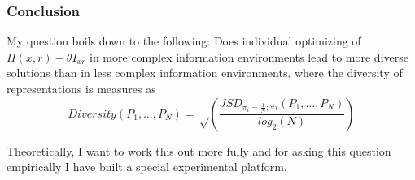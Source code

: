 \documentclass{beamer}
\begin{document}
\begin{frame}
\frametitle{Conclusion}
My question boils down to the following: Does individual optimizing of $\Pi(x, r) - \theta I_{xr}$ in more complex information environments lead to more diverse solutions than in less complex information environments, where the diversity of representations is measures as
\begin{equation}
Diversity(P_1, \ldots, P_N)=\sqrt\left(\frac{JSD_{\pi_i=\frac{1}{N}; \forall i}(P_1, \ldots, P_N)}{log_2(N)}\right)
\end{equation}

Theoretically, I want to work this out more fully and for asking this question empirically I have built a special experimental platform.   
\end{frame}


    
\end{document}
